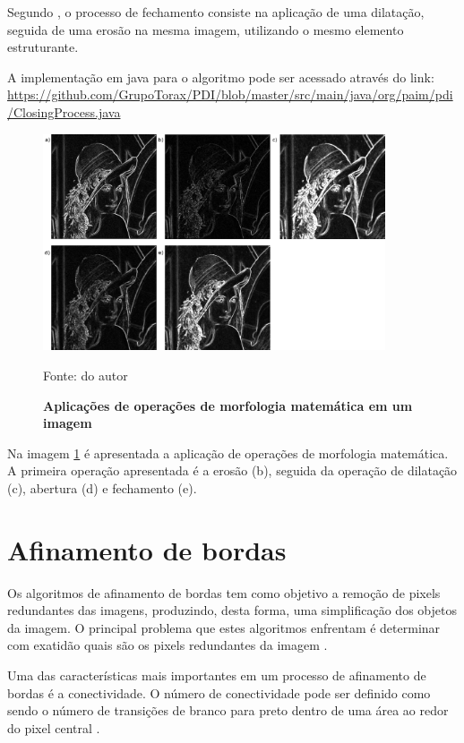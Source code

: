 \documentclass[
	12pt,				%
	oneside,			%
	a4paper,			%
	english,			%
	french,				%
	spanish,			%
	brazil,				%
	]{abntex2}
\begin{document}
Segundo \citet{pedriniSchwartz:2008}, o processo de fechamento consiste na aplicação de uma dilatação, seguida de uma erosão na mesma imagem, utilizando o mesmo elemento estruturante.

A implementação em java para o algoritmo pode ser acessado através do link:
\url{https://github.com/GrupoTorax/PDI/blob/master/src/main/java/org/paim/pdi/ClosingProcess.java}

\begin{figure}[ht]
\centering
\caption{\textbf{Aplicações de operações de morfologia matemática em um imagem}}
\includegraphics[width=0.9\textwidth]{imagens/morfologia.png}

Fonte: do autor
\label{fig:morfologia}
\end{figure}

Na imagem \ref{fig:morfologia} é apresentada a aplicação de operações de morfologia matemática. A primeira operação apresentada é a erosão (b), seguida da operação de dilatação (c), abertura (d) e fechamento (e).
    
\section{Afinamento de bordas}    

Os algoritmos de afinamento de bordas tem como objetivo a remoção de pixels redundantes das imagens, produzindo, desta forma, uma simplificação dos objetos da imagem. O principal problema que estes algoritmos enfrentam é determinar com exatidão quais são os pixels redundantes da imagem \cite{guilherme:2007}.

Uma das características mais importantes em um processo de afinamento de bordas é a conectividade. O número de conectividade pode ser definido como sendo o número de transições de branco para preto dentro de uma área ao redor do pixel central \cite{guilherme:2007}.
    
\end{document}
